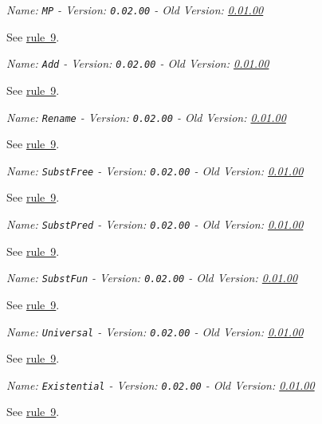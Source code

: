 \documentclass[a4paper,german,10pt,twoside]{book}
\theoremstyle{definition}
\theoremstyle{remark}
\begin{document}
\par
\label{rule:CP!MP} \hypertarget{rule:CP!MP}{}
{\em   Name: \verb]MP]  -  Version: \verb]0.02.00]  -  Old Version: \hyperlink{rule:modusPonens}{0.01.00}}

See \hyperlink{rule:CP}{rule~9}.


\par
\label{rule:CP!Add} \hypertarget{rule:CP!Add}{}
{\em   Name: \verb]Add]  -  Version: \verb]0.02.00]  -  Old Version: \hyperlink{rule:addProvenFormula}{0.01.00}}

See \hyperlink{rule:CP}{rule~9}.


\par
\label{rule:CP!Rename} \hypertarget{rule:CP!Rename}{}
{\em   Name: \verb]Rename]  -  Version: \verb]0.02.00]  -  Old Version: \hyperlink{rule:renameBound}{0.01.00}}

See \hyperlink{rule:CP}{rule~9}.


\par
\label{rule:CP!SubstFree} \hypertarget{rule:CP!SubstFree}{}
{\em   Name: \verb]SubstFree]  -  Version: \verb]0.02.00]  -  Old Version: \hyperlink{rule:replaceFree}{0.01.00}}

See \hyperlink{rule:CP}{rule~9}.


\par
\label{rule:CP!SubstPred} \hypertarget{rule:CP!SubstPred}{}
{\em   Name: \verb]SubstPred]  -  Version: \verb]0.02.00]  -  Old Version: \hyperlink{rule:replacePred}{0.01.00}}

See \hyperlink{rule:CP}{rule~9}.


\par
\label{rule:CP!SubstFun} \hypertarget{rule:CP!SubstFun}{}
{\em   Name: \verb]SubstFun]  -  Version: \verb]0.02.00]  -  Old Version: \hyperlink{rule:replaceFunct}{0.01.00}}

See \hyperlink{rule:CP}{rule~9}.


\par
\label{rule:CP!Universal} \hypertarget{rule:CP!Universal}{}
{\em   Name: \verb]Universal]  -  Version: \verb]0.02.00]  -  Old Version: \hyperlink{rule:universalGeneralization}{0.01.00}}

See \hyperlink{rule:CP}{rule~9}.


\par
\label{rule:CP!Existential} \hypertarget{rule:CP!Existential}{}
{\em   Name: \verb]Existential]  -  Version: \verb]0.02.00]  -  Old Version: \hyperlink{rule:existentialGeneralization}{0.01.00}}

See \hyperlink{rule:CP}{rule~9}.
\end{document}
